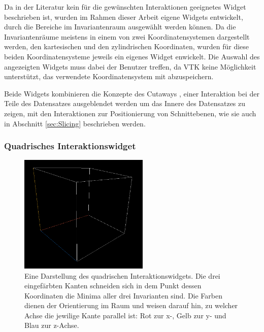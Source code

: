 \documentclass[a4paper,fontsize=12pt,toc=bib,halfparskip]{scrartcl}
\begin{document}
Da in der Literatur kein f\"ur die gew\"unschten Interaktionen geeignetes Widget beschrieben ist, wurden im Rahmen dieser Arbeit eigene Widgets entwickelt, durch die Bereiche im Invariantenraum ausgew\"ahlt werden k\"onnen. Da die Invariantenr\"aume meistens in einem von zwei Koordinatensystemen dargestellt werden, den kartesischen und den zylindrischen Koordinaten, wurden f\"ur diese beiden Koordinatensysteme jeweils ein eigenes Widget enwickelt. Die Auswahl des angezeigten Widgets muss dabei der Benutzer treffen, da VTK keine M\"oglichkeit unterst\"utzt, das verwendete Koordinatensystem mit abzuspeichern.

Beide Widgets kombinieren die Konzepte des Cutaways \cite[S.~406f]{preim2015interaktive}, einer Interaktion bei der Teile des Datensatzes ausgeblendet werden um das Innere des Datensatzes zu zeigen, mit den Interaktionen zur Positionierung von Schnittebenen, wie sie auch in Abschnitt \ref{sec:Slicing} beschrieben werden. 

\subsubsection{Quadrisches Interaktionswidget}

\begin{figure}
	\centering
	\includegraphics[width=0.55\textwidth]{pictures/QuadricInteractions.png}
	\caption{Eine Darstellung des quadrischen Interaktionswidgets. Die drei eingef\"arbten Kanten schneiden sich in dem Punkt dessen Koordinaten die Minima aller drei Invarianten sind. Die Farben dienen der Orientierung im Raum und weisen darauf hin, zu welcher Achse die jewilige Kante parallel ist: Rot zur x-, Gelb zur y- und Blau zur z-Achse.}
	\label{CubicalInteractions}
\end{figure}
\end{document}
